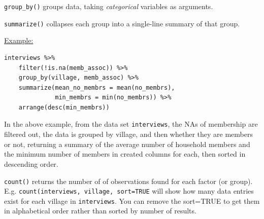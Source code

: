 \documentclass[12pt]{article}
\begin{document}
\texttt{group\_by()} groups data, taking \textit{categorical} variables as arguments.

\texttt{summarize()} collapses each group into a single-line summary of that group.

\underline{Example:}
\vspace{-1em}\begin{verbatim}
interviews %>%
    filter(!is.na(memb_assoc)) %>%
    group_by(village, memb_assoc) %>%
    summarize(mean_no_membrs = mean(no_membrs),
              min_membrs = min(no_membrs)) %>%
    arrange(desc(min_membrs))
\end{verbatim}
In the above example, from the data set \texttt{interviews}, the NAs of membership are filtered out, the data is grouped by village, and then whether they are members or not, returning a summary of the average number of household members and the minimum number of members in created columns for each, then sorted in descending order.

\texttt{count()} returns the number of of observations found for each factor (or group). E.g. \texttt{count(interviews, village, sort=TRUE} will show how many data entries exist for each village in \texttt{interviews}. You can remove the sort=TRUE to get them in alphabetical order rather than sorted by number of results.
\end{document}
